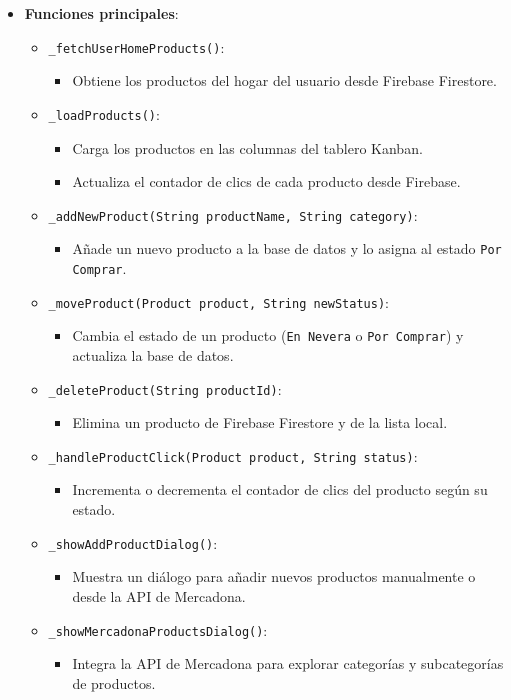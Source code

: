 \documentclass{article}
\begin{document}
\begin{flushleft}
\begin{itemize}
    \item \textbf{Funciones principales}:
    \begin{itemize}
        \item \texttt{\_fetchUserHomeProducts()}:
        \begin{itemize}
            \item Obtiene los productos del hogar del usuario desde Firebase Firestore.
        \end{itemize}
        \item \texttt{\_loadProducts()}:
        \begin{itemize}
            \item Carga los productos en las columnas del tablero Kanban.
            \item Actualiza el contador de clics de cada producto desde Firebase.
        \end{itemize}
        \item \texttt{\_addNewProduct(String productName, String category)}:
        \begin{itemize}
            \item A\~nade un nuevo producto a la base de datos y lo asigna al estado \texttt{Por Comprar}.
        \end{itemize}
        \item \texttt{\_moveProduct(Product product, String newStatus)}:
        \begin{itemize}
            \item Cambia el estado de un producto (\texttt{En Nevera} o \texttt{Por Comprar}) y actualiza la base de datos.
        \end{itemize}
        \item \texttt{\_deleteProduct(String productId)}:
        \begin{itemize}
            \item Elimina un producto de Firebase Firestore y de la lista local.
        \end{itemize}
        \item \texttt{\_handleProductClick(Product product, String status)}:
        \begin{itemize}
            \item Incrementa o decrementa el contador de clics del producto seg\'un su estado.
        \end{itemize}
        \item \texttt{\_showAddProductDialog()}:
        \begin{itemize}
            \item Muestra un di\'alogo para a\~nadir nuevos productos manualmente o desde la API de Mercadona.
        \end{itemize}
        \item \texttt{\_showMercadonaProductsDialog()}:
        \begin{itemize}
            \item Integra la API de Mercadona para explorar categor\'ias y subcategor\'ias de productos.
        \end{itemize}
    \end{itemize}


\end{itemize}
\end{flushleft}
\end{document}
